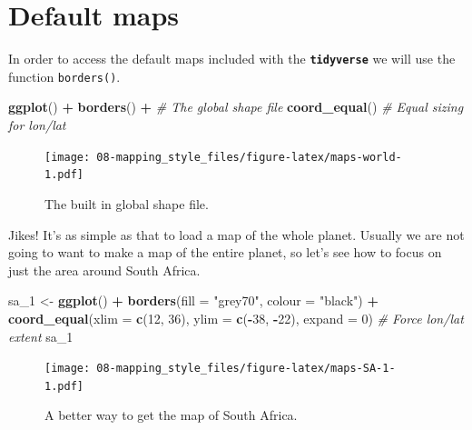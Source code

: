 \documentclass[]{book}
\newenvironment{Shaded}{\begin{snugshade}}{\end{snugshade}}
\newcommand{\KeywordTok}[1]{\textcolor[rgb]{0.13,0.29,0.53}{\textbf{#1}}}
\newcommand{\DataTypeTok}[1]{\textcolor[rgb]{0.13,0.29,0.53}{#1}}
\newcommand{\DecValTok}[1]{\textcolor[rgb]{0.00,0.00,0.81}{#1}}
\newcommand{\StringTok}[1]{\textcolor[rgb]{0.31,0.60,0.02}{#1}}
\newcommand{\CommentTok}[1]{\textcolor[rgb]{0.56,0.35,0.01}{\textit{#1}}}
\newcommand{\OperatorTok}[1]{\textcolor[rgb]{0.81,0.36,0.00}{\textbf{#1}}}
\newcommand{\NormalTok}[1]{#1}
\theoremstyle{definition}
\theoremstyle{definition}
\theoremstyle{definition}
\theoremstyle{remark}
\begin{document}
\section{Default maps}\label{default-maps}

In order to access the default maps included with the
\textbf{\texttt{tidyverse}} we will use the function \texttt{borders()}.

\begin{Shaded}
\begin{Highlighting}[]
\KeywordTok{ggplot}\NormalTok{() }\OperatorTok{+}
\StringTok{  }\KeywordTok{borders}\NormalTok{() }\OperatorTok{+}\StringTok{ }\CommentTok{# The global shape file}
\StringTok{  }\KeywordTok{coord_equal}\NormalTok{() }\CommentTok{# Equal sizing for lon/lat }
\end{Highlighting}
\end{Shaded}

\begin{figure}
\centering
\texttt{[image: 08-mapping\_style\_files/figure-latex/maps-world-1.pdf]}
\caption{\label{fig:maps-world}The built in global shape file.}
\end{figure}

Jikes! It's as simple as that to load a map of the whole planet. Usually
we are not going to want to make a map of the entire planet, so let's
see how to focus on just the area around South Africa.

\begin{Shaded}
\begin{Highlighting}[]
\NormalTok{sa_}\DecValTok{1}\NormalTok{ <-}\StringTok{ }\KeywordTok{ggplot}\NormalTok{() }\OperatorTok{+}
\StringTok{  }\KeywordTok{borders}\NormalTok{(}\DataTypeTok{fill =} \StringTok{"grey70"}\NormalTok{, }\DataTypeTok{colour =} \StringTok{"black"}\NormalTok{) }\OperatorTok{+}
\StringTok{  }\KeywordTok{coord_equal}\NormalTok{(}\DataTypeTok{xlim =} \KeywordTok{c}\NormalTok{(}\DecValTok{12}\NormalTok{, }\DecValTok{36}\NormalTok{), }\DataTypeTok{ylim =} \KeywordTok{c}\NormalTok{(}\OperatorTok{-}\DecValTok{38}\NormalTok{, }\OperatorTok{-}\DecValTok{22}\NormalTok{), }\DataTypeTok{expand =} \DecValTok{0}\NormalTok{) }\CommentTok{# Force lon/lat extent}
\NormalTok{sa_}\DecValTok{1}
\end{Highlighting}
\end{Shaded}

\begin{figure}
\centering
\texttt{[image: 08-mapping\_style\_files/figure-latex/maps-SA-1-1.pdf]}
\caption{\label{fig:maps-SA-1}A better way to get the map of South Africa.}
\end{figure}
\end{document}
